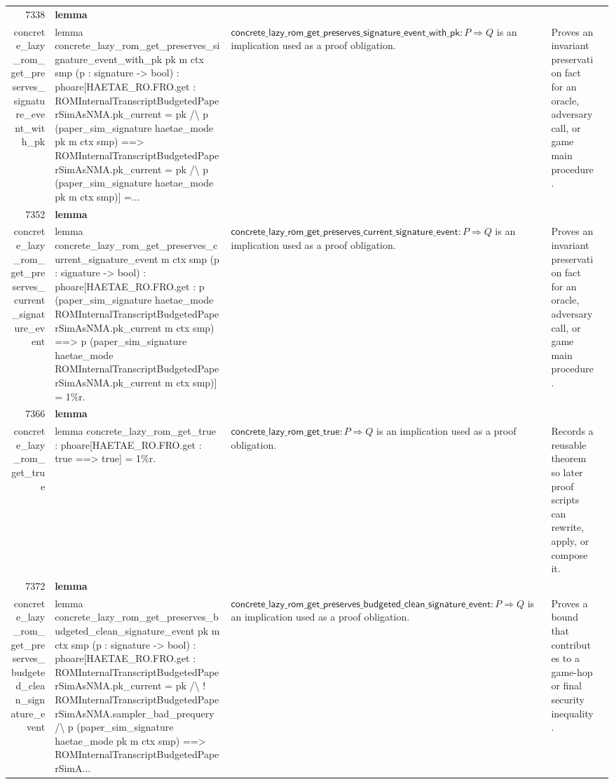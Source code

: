 \documentclass[10pt]{article}
\newcommand{\ec}[1]{\begingroup\ttfamily\scriptsize #1\endgroup}
\begin{document}
\begin{longtable}{r L{0.17\textwidth} L{0.26\textwidth} L{0.27\textwidth} L{0.20\textwidth}}
7338 & \textbf{lemma}\\\ec{concrete\_lazy\_rom\_get\_preserves\_signature\_event\_with\_pk} & \ec{lemma concrete\_lazy\_rom\_get\_preserves\_signature\_event\_with\_pk pk m ctx smp (p : signature -> bool) : phoare[HAETAE\_RO.FRO.get : ROMInternalTranscriptBudgetedPaperSimAsNMA.pk\_current = pk /\textbackslash{} p (paper\_sim\_signature haetae\_mode pk m ctx smp) ==> ROMInternalTranscriptBudgetedPaperSimAsNMA.pk\_current = pk /\textbackslash{} p (paper\_sim\_signature haetae\_mode pk m ctx smp)] =...} & \(\mathsf{concrete\_lazy\_rom\_get\_preserves\_signature\_event\_with\_pk} : P \Rightarrow Q\) is an implication used as a proof obligation. & Proves an invariant preservation fact for an oracle, adversary call, or game main procedure. \\
7352 & \textbf{lemma}\\\ec{concrete\_lazy\_rom\_get\_preserves\_current\_signature\_event} & \ec{lemma concrete\_lazy\_rom\_get\_preserves\_current\_signature\_event m ctx smp (p : signature -> bool) : phoare[HAETAE\_RO.FRO.get : p (paper\_sim\_signature haetae\_mode ROMInternalTranscriptBudgetedPaperSimAsNMA.pk\_current m ctx smp) ==> p (paper\_sim\_signature haetae\_mode ROMInternalTranscriptBudgetedPaperSimAsNMA.pk\_current m ctx smp)] = 1\%r.} & \(\mathsf{concrete\_lazy\_rom\_get\_preserves\_current\_signature\_event} : P \Rightarrow Q\) is an implication used as a proof obligation. & Proves an invariant preservation fact for an oracle, adversary call, or game main procedure. \\
7366 & \textbf{lemma}\\\ec{concrete\_lazy\_rom\_get\_true} & \ec{lemma concrete\_lazy\_rom\_get\_true : phoare[HAETAE\_RO.FRO.get : true ==> true] = 1\%r.} & \(\mathsf{concrete\_lazy\_rom\_get\_true} : P \Rightarrow Q\) is an implication used as a proof obligation. & Records a reusable theorem so later proof scripts can rewrite, apply, or compose it. \\
7372 & \textbf{lemma}\\\ec{concrete\_lazy\_rom\_get\_preserves\_budgeted\_clean\_signature\_event} & \ec{lemma concrete\_lazy\_rom\_get\_preserves\_budgeted\_clean\_signature\_event pk m ctx smp (p : signature -> bool) : phoare[HAETAE\_RO.FRO.get : ROMInternalTranscriptBudgetedPaperSimAsNMA.pk\_current = pk /\textbackslash{} ! ROMInternalTranscriptBudgetedPaperSimAsNMA.sampler\_bad\_prequery /\textbackslash{} p (paper\_sim\_signature haetae\_mode pk m ctx smp) ==> ROMInternalTranscriptBudgetedPaperSimA...} & \(\mathsf{concrete\_lazy\_rom\_get\_preserves\_budgeted\_clean\_signature\_event} : P \Rightarrow Q\) is an implication used as a proof obligation. & Proves a bound that contributes to a game-hop or final security inequality. \\

\end{longtable}
\end{document}
